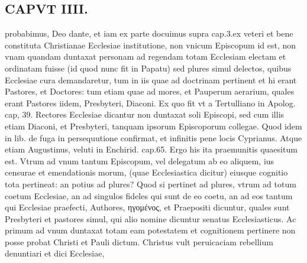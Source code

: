 \documentclass{article}
\begin{document}
\begin{pages}
\section*{CAPVT  IIII. }
\marginpar{[ p.241 ]}\pstart probabimus, Deo dante, et iam ex parte docuimus supra cap.3.ex veteri et bene constituta Christianae Ecclesiae institutione, non vnicum Episcopum id est, non vnam quandam duntaxat personam ad regendam totam Ecclesiam electam et ordinatam fuisse (id quod nunc fit in Papatu) sed plures simul delectos, quibus Ecclesiae cura demandaretur, tum in iis quae ad doctrinam pertinent et hi erant Pastores, et Doctores: tum etiam quae ad mores, et Pauperum aerarium, quales erant Pastores iidem, Presbyteri, Diaconi. Ex quo fit vt a Tertulliano in Apolog. cap, 39. Rectores Ecclesiae dicantur non duntaxat soli Episcopi, sed cum illis etiam Diaconi, et Presbyteri, tanquam ipsorum Episcoporum collegae. Quod idem in lib.  de fuga in persequutione confirmat, et infinitis pene locis Cyprianus. Atque etiam Augustinus, veluti in Enchirid. cap.65. Ergo his ita praemunitis quaesitum est. Vtrum ad vnum tantum Episcopum, vel delegatum ab eo aliquem, ius censurae et emendationis morum, (quae Ecclesiastica dicitur) eiusque cognitio tota pertineat: an potius ad plures? Quod si pertinet ad plures, vtrum ad totum coetum Ecclesiae, an ad singulos fideles qui sunt de eo coetu, an ad eos tantum qui Ecclesiae praefecti, Authores, ηγομένος, et Praepositi dicuntur, quales sunt Presbyteri et pastores simul, qui alio nomine dicuntur senatus Ecclesiasticus. Ac primum ad vnum duntaxat totam eam potestatem et cognitionem pertinere non posse probat Christi et Pauli dictum. Christus vult peruicaciam rebellium denuntiari et dici Ecclesiae,  \pend

\end{pages}
\end{document}
